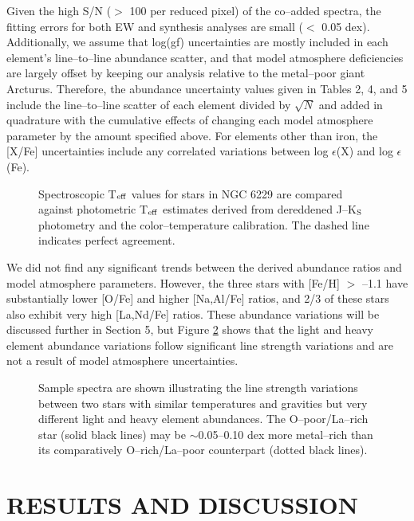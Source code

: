 \documentclass[12pt,preprint]{emulateapj}
\begin{document}
Given the high S/N ($>$ 100 per reduced pixel) of the co--added spectra, the 
fitting errors for both EW and synthesis analyses are small ($<$ 0.05
dex).  Additionally, we assume that log(gf) uncertainties are mostly included
in each element's line--to--line abundance scatter, and that model atmosphere
deficiencies are largely offset by keeping our analysis relative to the 
metal--poor giant Arcturus.  Therefore, the abundance uncertainty values given
in Tables 2, 4, and 5 include the line--to--line scatter of each element 
divided by $\sqrt{N}$ and added in quadrature with the cumulative effects of 
changing each model atmosphere parameter by the amount specified above.  For
elements other than iron, the [X/Fe] uncertainties include any correlated 
variations between log $\epsilon$(X) and log $\epsilon$(Fe).

\begin{figure}
\caption{Spectroscopic T$_{\rm eff}$ values for stars in NGC 6229 are compared
against photometric T$_{\rm eff}$ estimates derived from dereddened
J--K$_{\rm S}$ photometry and the \citet{GHB09} color--temperature calibration.
The dashed line indicates perfect agreement.}
\label{f3}
\end{figure}

We did not find any significant trends between the derived abundance ratios
and model atmosphere parameters.  However, the three stars with [Fe/H] $>$ 
--1.1 have substantially lower [O/Fe] and higher [Na,Al/Fe] ratios, and 
2/3 of these stars also exhibit very high [La,Nd/Fe] ratios.  These abundance
variations will be discussed further in Section 5, but Figure \ref{f4} shows
that the light and heavy element abundance variations follow significant 
line strength variations and are not a result of model atmosphere 
uncertainties.

\begin{figure}
\caption{Sample spectra are shown illustrating the line strength variations
between two stars with similar temperatures and gravities but very different
light and heavy element abundances.  The O--poor/La--rich star (solid black
lines) may be $\sim$0.05--0.10 dex more metal--rich than its comparatively
O--rich/La--poor counterpart (dotted black lines).}
\label{f4}
\end{figure}

\section{RESULTS AND DISCUSSION}
\end{document}
